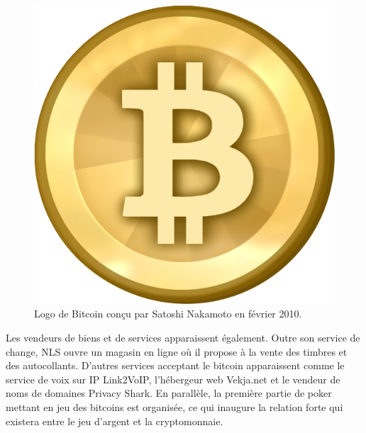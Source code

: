 \begin{figure}[h]
  \centering
  \includegraphics[scale=0.15]{img/bitcoin530.png}
  \caption{Logo de Bitcoin conçu par Satoshi Nakamoto en février 2010.}
\end{figure}

Les vendeurs de biens et de services apparaissent également. Outre son service de change, NLS ouvre un magasin en ligne où il propose à la vente des timbres et des autocollants. D'autres services acceptant le bitcoin apparaissent comme le service de voix sur IP Link2VoIP, l'hébergeur web Vekja.net et le vendeur de noms de domaines Privacy Shark. En parallèle, la première partie de poker mettant en jeu des bitcoins est organisée, ce qui inaugure la relation forte qui existera entre le jeu d'argent et la cryptomonnaie.


